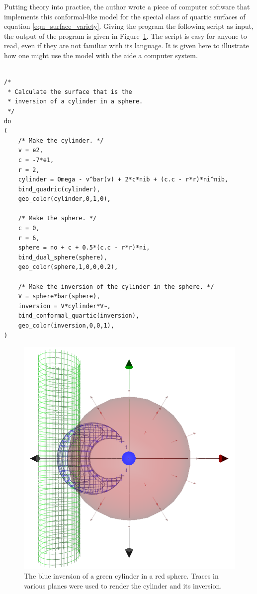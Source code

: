 \documentclass{birkjour}
\theoremstyle{definition}
\theoremstyle{remark}
\numberwithin{equation}{section}
\begin{document}
Putting theory into practice, the author wrote a piece of computer
software that implements this conformal-like model for the special class of
quartic surfaces of equation \eqref{equ_surface_variety}.  Giving the program the following
script as input, the output of the program is given in Figure~\ref{fig_reflect_cylinder_in_sphere}.
The script is easy for anyone to read, even if they are not familiar with its language.  It is given
here to illustrate how one might use the model with the aide a computer system.
\begin{samepage}
{\small
\begin{verbatim}

/*
 * Calculate the surface that is the
 * inversion of a cylinder in a sphere.
 */
do
(
    /* Make the cylinder. */
    v = e2,
    c = -7*e1,
    r = 2,
    cylinder = Omega - v^bar(v) + 2*c*nib + (c.c - r*r)*ni^nib,
    bind_quadric(cylinder),
    geo_color(cylinder,0,1,0),
	
    /* Make the sphere. */
    c = 0,
    r = 6,
    sphere = no + c + 0.5*(c.c - r*r)*ni,
    bind_dual_sphere(sphere),
    geo_color(sphere,1,0,0,0.2),
	
    /* Make the inversion of the cylinder in the sphere. */
    V = sphere*bar(sphere),
    inversion = V*cylinder*V~,
    bind_conformal_quartic(inversion),
    geo_color(inversion,0,0,1),
)
\end{verbatim}
}
\end{samepage}
\begin{figure}
\includegraphics[scale=0.4]{ReflectCylinderInSphere}
\caption{The blue inversion of a green cylinder in a red sphere.  Traces in various planes were
used to render the cylinder and its inversion.}
\label{fig_reflect_cylinder_in_sphere}
\end{figure}
\end{document}
